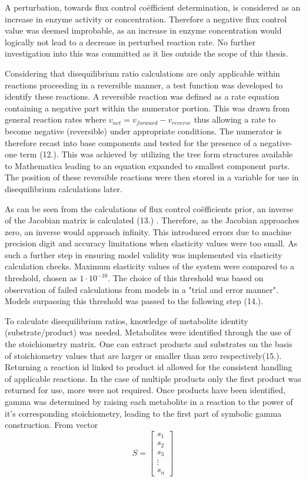 A perturbation, towards flux control co\"efficient determination, is considered as an increase in enzyme activity or concentration. Therefore a negative flux control value was deemed improbable, as an increase in enzyme concentration would logically not lead to a decrease in perturbed reaction rate. No further investigation into this was committed as it lies outside the scope of this thesis.

Considering that disequilibrium ratio calculations are only applicable within reactions proceeding in a reversible manner, a test function was developed to identify these reactions. A reversible reaction was defined as a rate equation containing a negative part within the numerator portion. This was drawn from general reaction rates where $v_{net} = v_{forward} - v_{reverse}$ thus allowing a rate to become negative (reversible) under appropriate conditions. The numerator is therefore recast into base components and tested for the presence of a negative-one term (12.). This was achieved by utilizing the tree form structures available to Mathematica leading to an equation expanded to smallest component parts. The position of these reversible reactions were then stored in a variable for use in disequilibrium calculations later. 

As can be seen from the calculations of flux control co\"efficients prior, an inverse of the Jacobian matrix is calculated (13.) \citeauthor{Hofmeyr2001}. Therefore, as the Jacobian approaches zero, an inverse would approach infinity. This introduced errors due to machine precision digit and accuracy limitations when elasticity values were too small. As such a further step in ensuring model validity was implemented via elasticity calculation checks. Maximum elasticity values of the system were compared to a threshold, chosen as $1 \cdot 10^{-10}$. The choice of this threshold was based on observation of failed calculations from models in a "trial and error manner".  Models surpassing this threshold was passed to the following step (14.). 

To calculate disequilibrium ratios, knowledge of metabolite identity (substrate/product) was needed. Metabolites were identified through the use of the stoichiometry matrix. One can extract products and substrates on the basis of stoichiometry values that are larger or smaller than zero respectively(15.). Returning a reaction id linked to product id allowed for the consistent handling of applicable reactions. In the case of multiple products only the first product was returned for use, more were not required. Once products have been identified, gamma was determined by raising each metabolite in a reaction to the power of it's corresponding stoichiometry, leading to the first part of symbolic gamma construction. From vector 
\[
S
=
\begin{bmatrix}
    s_{1} \\
    s_{2} \\
    s_{3} \\
    \vdots \\
    s_{n} 
\end{bmatrix}
\]

